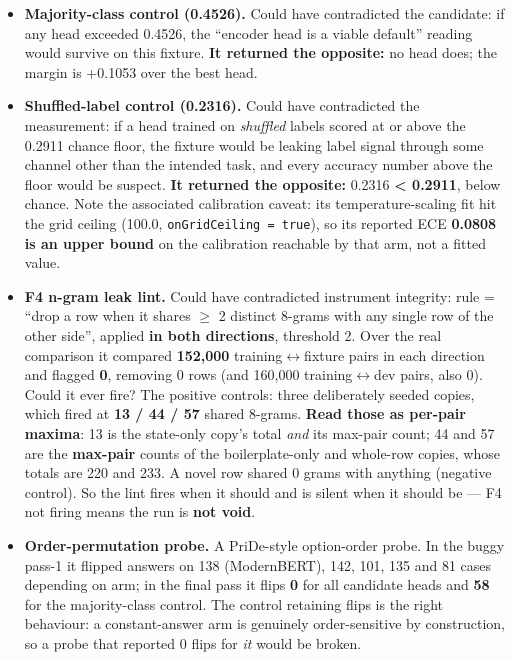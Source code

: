 \documentclass[10pt]{article}
\begin{document}
\begin{itemize}
\item \textbf{Majority-class control (0.4526).} Could have contradicted the candidate: if any head exceeded 0.4526, the ``encoder head is a viable default'' reading would survive on this fixture. \textbf{It returned the opposite:} no head does; the margin is +0.1053 over the best head.
\item \textbf{Shuffled-label control (0.2316).} Could have contradicted the measurement: if a head trained on \emph{shuffled} labels scored at or above the 0.2911 chance floor, the fixture would be leaking label signal through some channel other than the intended task, and every accuracy number above the floor would be suspect. \textbf{It returned the opposite:} 0.2316 \textbf{< 0.2911}, below chance. Note the associated calibration caveat: its temperature-scaling fit hit the grid ceiling (100.0, \texttt{onGridCeiling = true}), so its reported ECE \textbf{0.0808 is an upper bound} on the calibration reachable by that arm, not a fitted value.
\item \textbf{F4 n-gram leak lint.} Could have contradicted instrument integrity: rule = ``drop a row when it shares $\ge$ 2 distinct 8-grams with any single row of the other side'', applied \textbf{in both directions}, threshold 2. Over the real comparison it compared \textbf{152,000} training$\leftrightarrow$fixture pairs in each direction and flagged \textbf{0}, removing 0 rows (and 160,000 training$\leftrightarrow$dev pairs, also 0). Could it ever fire? The positive controls: three deliberately seeded copies, which fired at \textbf{13 / 44 / 57} shared 8-grams. \textbf{Read those as per-pair maxima}: 13 is the state-only copy's total \emph{and} its max-pair count; 44 and 57 are the \textbf{max-pair} counts of the boilerplate-only and whole-row copies, whose totals are 220 and 233. A novel row shared 0 grams with anything (negative control). So the lint fires when it should and is silent when it should be --- F4 not firing means the run is \textbf{not void}.
\item \textbf{Order-permutation probe.} A PriDe-style option-order probe. In the buggy pass-1 it flipped answers on 138 (ModernBERT), 142, 101, 135 and 81 cases depending on arm; in the final pass it flips \textbf{0} for all candidate heads and \textbf{58} for the majority-class control. The control retaining flips is the right behaviour: a constant-answer arm is genuinely order-sensitive by construction, so a probe that reported 0 flips for \emph{it} would be broken.

\end{itemize}
\end{document}
